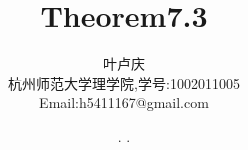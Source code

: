 \documentclass[a4paper, 12pt]{article} %
\makeatletter
\renewcommand{\maketitle}{ %
  \renewcommand\refname{参考文献}
  \newcommand{\D}{\displaystyle}\newcommand{\ri}{\Rightarrow}
  \newcommand{\ds}{\displaystyle} \renewcommand{\ni}{\noindent}
  \newcommand{\pa}{\partial} \newcommand{\Om}{\Omega}
  \newcommand{\om}{\omega} \newcommand{\sik}{\sum_{i=1}^k}
  \newcommand{\vov}{\Vert\omega\Vert} \newcommand{\Umy}{U_{\mu_i,y^i}}
  \newcommand{\lamns}{\lambda_n^{^{\scriptstyle\sigma}}}
  \newcommand{\chiomn}{\chi_{_{\Omega_n}}}
  \newcommand{\ullim}{\underline{\lim}} \newcommand{\bsy}{\boldsymbol}
  \newcommand{\mvb}{\mathversion{bold}} \newcommand{\la}{\lambda}
  \newcommand{\La}{\Lambda} \newcommand{\va}{\varepsilon}
  \newcommand{\be}{\beta} \newcommand{\al}{\alpha}
  \newcommand{\dis}{\displaystyle} \newcommand{\R}{{\mathbb R}}
  \newcommand{\N}{{\mathbb N}} \newcommand{\cF}{{\mathcal F}}
  \newcommand{\gB}{{\mathfrak B}} \newcommand{\eps}{\epsilon}
  \begin{flushright} %
    {\LARGE\@title} %
    
    \vspace{50pt} %
    
    {\large\@author} %
    \\\@date %
    
    \vspace{40pt} %
  \end{flushright}
}
\makeatother
\begin{document}
\title{\textbf{Theorem7.3}} 
\author{\small{叶卢庆}\\{\small{杭州师范大学理学院,学号:1002011005}}\\{\small{Email:h5411167@gmail.com}}} %
\renewcommand{\today}{\number\year. \number\month. \number\day}
\date{\today} %



\maketitle %






\end{document}
